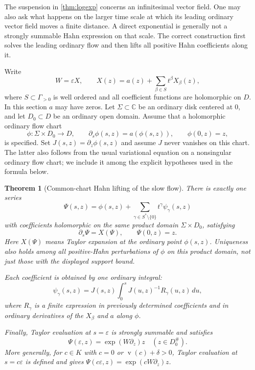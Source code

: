 \documentclass[11pt,a4paper]{article}
\numberwithin{equation}{section}
\newtheorem{theorem}{Theorem}[section]
\theoremstyle{definition}
\theoremstyle{remark}
\newcommand{\C}{\mathbb C}
\newcommand{\eps}{\varepsilon}
\newcommand{\val}{\operatorname{v}}
\begin{document}
The suspension in \cref{thm:logexp} concerns an infinitesimal vector field.
One may also ask what happens on the larger time scale at which its leading
ordinary vector field moves a finite distance.  A direct exponential is
generally not a strongly summable Hahn expression on that scale.  The
correct construction first solves the leading ordinary flow and then lifts
all positive Hahn coefficients along it.

Write
\begin{equation}\label{eq:slow-vector}
 W=\eps X,\qquad
 X(z)=a(z)+\sum_{\beta\in S}t^\beta X_\beta(z),
\end{equation}
where $S\subset\Gamma_{>0}$ is well ordered and all coefficient functions
are holomorphic on $D$.  In this section $a$ may have zeros.  Let
$\Sigma\subset\C$ be an ordinary disk centered at $0$, and let
$D_0\subset D$ be an ordinary open domain.  Assume that a holomorphic
ordinary flow chart
\begin{equation}\label{eq:ordinary-flow}
 \phi:\Sigma\times D_0\longrightarrow D,
 \qquad \partial_s\phi(s,z)=a(\phi(s,z)),\qquad\phi(0,z)=z,
\end{equation}
is specified.  Set $J(s,z)=\partial_z\phi(s,z)$ and assume $J$ never
vanishes on this chart.  The latter also follows from the usual variational
equation on a nonsingular ordinary flow chart; we include it among the
explicit hypotheses used in the formula below.

\begin{theorem}[Common-chart Hahn lifting of the slow flow]
\label{thm:slowtime}
There is exactly one series
\begin{equation}\label{eq:slow-solution}
 \Psi(s,z)=\phi(s,z)+
    \sum_{\gamma\in S^*\setminus\{0\}}t^\gamma\psi_\gamma(s,z)
\end{equation}
with coefficients holomorphic on the \emph{same} product domain
$\Sigma\times D_0$, satisfying
\begin{equation}\label{eq:slow-equation}
 \partial_s\Psi=X(\Psi),\qquad\Psi(0,z)=z.
\end{equation}
Here $X(\Psi)$ means Taylor expansion at the ordinary point $\phi(s,z)$.
Uniqueness also holds among all positive-Hahn perturbations of $\phi$ on
this product domain, not just those with the displayed support bound.

Each coefficient is obtained by one ordinary integral:
\begin{equation}\label{eq:variation-formula}
 \psi_\gamma(s,z)=J(s,z)
       \int_0^s J(u,z)^{-1}R_\gamma(u,z)\,du,
\end{equation}
where $R_\gamma$ is a finite expression in previously determined
coefficients and in ordinary derivatives of the $X_\beta$ and $a$
along $\phi$.

Finally, Taylor evaluation at $s=\eps$ is strongly summable and satisfies
\begin{equation}\label{eq:slow-epsilon}
 \Psi(\eps,z)=\exp(W\partial_z)z\quad(z\in D_0^\#).
\end{equation}
More generally, for $c\in K$ with $c=0$ or $\val(c)+\delta>0$,
Taylor evaluation at $s=c\eps$ is defined and gives
$\Psi(c\eps,z)=\exp(cW\partial_z)z$.
\end{theorem}
\end{document}
